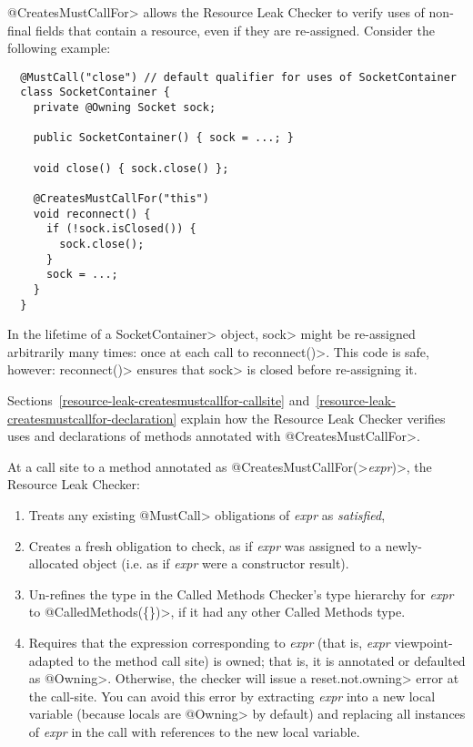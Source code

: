 \<@CreatesMustCallFor> allows the Resource Leak Checker to verify uses of non-final fields
that contain a resource, even if they are re-assigned. Consider
the following example:

\begin{verbatim}
  @MustCall("close") // default qualifier for uses of SocketContainer
  class SocketContainer {
    private @Owning Socket sock;

    public SocketContainer() { sock = ...; }

    void close() { sock.close() };

    @CreatesMustCallFor("this")
    void reconnect() {
      if (!sock.isClosed()) {
        sock.close();
      }
      sock = ...;
    }
  }
\end{verbatim}

In the lifetime of a \<SocketContainer> object, \<sock>
might be re-assigned arbitrarily many times: once at each
call to \<reconnect()>. This code is safe, however: \<reconnect()>
ensures that \<sock> is closed before re-assigning it.

Sections~\ref{resource-leak-createsmustcallfor-callsite}
and~\ref{resource-leak-createsmustcallfor-declaration}
explain how the Resource Leak Checker verifies uses and declarations of
methods annotated with \<@CreatesMustCallFor>.



At a call site to a method annotated as
\<@CreatesMustCallFor(>\emph{expr}\<)>, the Resource Leak Checker:
\begin{enumerate}
\item
  Treats any existing \<@MustCall> obligations of \emph{expr} as \emph{satisfied},
\item
  Creates a fresh obligation to check, as if \emph{expr} was assigned to a newly-allocated
  object (i.e. as if \emph{expr} were a constructor result).
\item
  Un-refines the type in the Called Methods Checker's type hierarchy for \emph{expr} to
  \<@CalledMethods(\{\})>, if it had any other Called Methods type.
\item
  Requires that the expression corresponding to \emph{expr} (that is, \emph{expr}
  viewpoint-adapted to the method call site) is owned; that is, it is
  annotated or defaulted as \<@Owning>.  Otherwise, the checker
  will issue a \<reset.not.owning> error at the call-site. You can avoid this
  error by extracting \emph{expr} into a new local variable (because
  locals are \<@Owning> by default) and replacing all instances of \emph{expr}
  in the call with references to the new local variable.
\end{enumerate}

